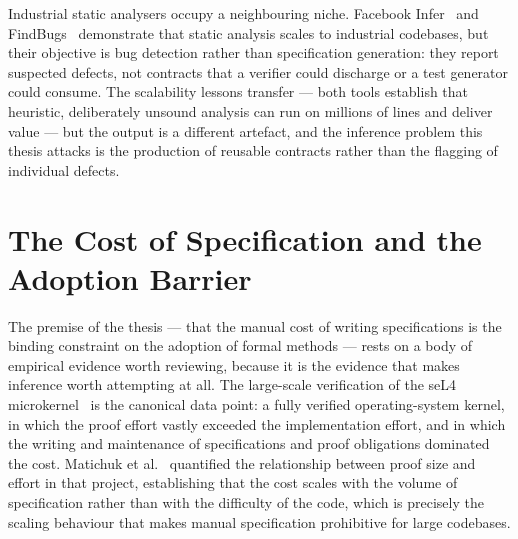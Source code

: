 Industrial static analysers occupy a neighbouring niche. Facebook
Infer~\cite{calcagno2015infer} and FindBugs~\cite{hovemeyer2004finding}
demonstrate that static analysis scales to industrial codebases, but their
objective is bug detection rather than specification generation: they report
suspected defects, not contracts that a verifier could discharge or a test
generator could consume. The scalability lessons transfer --- both tools
establish that heuristic, deliberately unsound analysis can run on millions of
lines and deliver value --- but the output is a different artefact, and the
inference problem this thesis attacks is the production of reusable contracts
rather than the flagging of individual defects.

\section{The Cost of Specification and the Adoption Barrier}
\label{sec:bg-cost}

The premise of the thesis --- that the manual cost of writing specifications is
the binding constraint on the adoption of formal methods --- rests on a body of
empirical evidence worth reviewing, because it is the evidence that makes
inference worth attempting at all. The large-scale verification of the seL4
microkernel~\cite{klein2014sel4, andronick_large-scale_2012} is the canonical
data point: a fully verified operating-system kernel, in which the proof effort
vastly exceeded the implementation effort, and in which the writing and
maintenance of specifications and proof obligations dominated the cost.
Matichuk et al.~\cite{matichuk_cost_2015} quantified the relationship between
proof size and effort in that project, establishing that the cost scales with
the volume of specification rather than with the difficulty of the code, which
is precisely the scaling behaviour that makes manual specification prohibitive
for large codebases.


